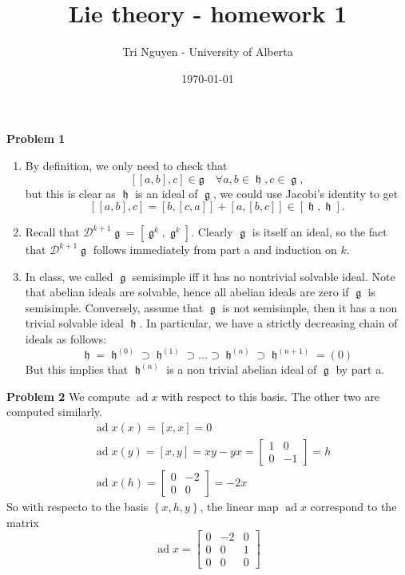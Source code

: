 \documentclass[12pt]{article} %
\title{Lie theory - homework 1} %
\author{Tri Nguyen - University of Alberta} %
\date{\today} %
\DeclareMathOperator{\frkh}{\mathfrak{h}}
\DeclareMathOperator{\frkg}{\mathfrak{g}}
\DeclareMathOperator{\ad}{ad}
\begin{document}
\maketitle
\textbf{Problem 1}
\begin{enumerate}
    \item By definition, we only need to check that
          \[[[a,b],c] \in \mathfrak{g} \quad \forall a,b \in \frkh, c \in \frkg,\]
          but this is clear as $\frkh$ is an ideal of $\frkg$, we could use Jacobi's identity to get
          \[[[a,b],c] = [b,[c,a]]+ [a,[b,c]] \in [\frkh,\frkh].\]
    \item Recall that $\mathcal{D}^{k+1} \frkg = [\frkg^k,\frkg^k]$. Clearly $\frkg$ is itself an ideal, so the fact that
          $\mathcal{D}^{k+1}\frkg$ follows immediately from part a and induction on $k$.
    \item In class, we called $\frkg$ semisimple iff it has no nontrivial solvable ideal. Note that abelian ideals are solvable, hence all abelian ideals are zero if $\frkg$ is semisimple.
          Conversely, assume that $\frkg$ is not semisimple, then it has a non trivial solvable ideal $\frkh$. In particular, we have a strictly decreasing chain of ideals as follows:
          \[\frkh = \frkh^{(0)} \supset \frkh^{(1)} \supset \ldots \supset \frkh^{(n)} \supset \frkh^{(n+1)}= (0)\]
          But this implies that $\frkh^{(n)}$ is a non trivial abelian ideal of $\frkg$ by part a.
\end{enumerate}
\textbf{Problem 2}
We compute $\ad x$ with respect to this basis. The other two are computed similarly.
\begin{align}
     & \ad x (x) = [x,x]=0                           \\
     & \ad x (y) = [x,y] = xy-yx = \begin{bmatrix}
                                       1 & 0  \\
                                       0 & -1
                                   \end{bmatrix} = h \\
     & \ad x(h) = \begin{bmatrix}
                      0 & -2 \\
                      0 & 0
                  \end{bmatrix}=-2x
\end{align}
So with respecto to the basis $\left\lbrace x,h,y\right\rbrace$, the linear map $\ad x$ correspond to the matrix
\[ \ad x =\begin{bmatrix}
        0 & -2 & 0 \\
        0 & 0  & 1 \\
        0 & 0  & 0
    \end{bmatrix}\]
\end{document}

